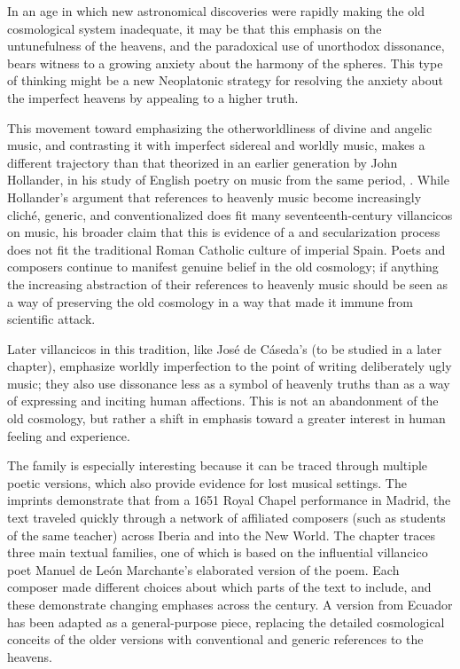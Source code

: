 \documentclass[tt]{vcbook-proposal}
\begin{document}
In an age in which new astronomical discoveries were rapidly making the old cosmological system inadequate, it may be that this emphasis on the untunefulness of the heavens, and the paradoxical use of unorthodox dissonance, bears witness to a growing anxiety about the harmony of the spheres.
This type of thinking might be a new Neoplatonic strategy for resolving the anxiety about the imperfect heavens by appealing to a higher truth.

This movement toward emphasizing the otherworldliness of divine and angelic music, and contrasting it with imperfect sidereal and worldly music, makes a different trajectory than that theorized in an earlier generation by John Hollander, in his study of English poetry on music from the same period, .
While Hollander's argument that references to heavenly music become increasingly cliché, generic, and conventionalized does fit many seventeenth-century villancicos on music, his broader claim that this is evidence of a  and secularization process does not fit the traditional Roman Catholic culture of imperial Spain.
Poets and composers continue to manifest genuine belief in the old cosmology; if anything the increasing abstraction of their references to heavenly music should be seen as a way of preserving the old cosmology in a way that made it immune from scientific attack.

Later villancicos in this tradition, like José de Cáseda's  (to be studied in a later chapter), emphasize worldly imperfection to the point of writing deliberately ugly music; they also use dissonance less as a symbol of heavenly truths than as a way of expressing and inciting human affections.
This is not an abandonment of the old cosmology, but rather a shift in emphasis toward a greater interest in human feeling and experience.

The  family is especially interesting because it can be traced through multiple poetic versions, which also provide evidence for lost musical settings.
The imprints demonstrate that from a 1651 Royal Chapel performance in Madrid, the text traveled quickly through a network of affiliated composers (such as students of the same teacher) across Iberia and into the New World. 
The chapter traces three main textual families, one of which is based on the influential villancico poet Manuel de León Marchante's elaborated version of the poem. 
Each composer made different choices about which parts of the text to include, and these demonstrate changing emphases across the century.
A version from Ecuador has been adapted as a general-purpose piece, replacing the detailed cosmological conceits of the older versions with conventional and generic references to the heavens.
\end{document}
